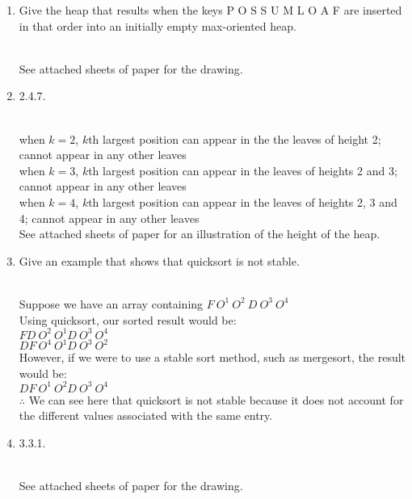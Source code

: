 \documentclass[11pt]{article}
\begin{document}
\begin{enumerate}
\begin{solution}
\end{solution}

\item Give the heap that results when the keys P O S S U M L O A F are inserted in that order into an initially empty max-oriented heap.\\
\begin{solution}\\
See attached sheets of paper for the drawing.
\end{solution}

\item 2.4.7.
\begin{solution}\\
when $k = 2$, $k$th largest position can appear in the the leaves of height 2; cannot appear in any other leaves\\
when $k = 3$, $k$th largest position can appear in the leaves of heights 2 and 3; cannot appear in any other leaves\\
when $k = 4$, $k$th largest position can appear in the leaves of heights 2, 3 and 4; cannot appear in any other leaves\\
See attached sheets of paper for an illustration of the height of the heap.
\end{solution}

\item Give an example that shows that quicksort is not stable.\\
\begin{solution}\\
Suppose we have an array containing $F\ O^{1}\ O^{2}\ D \ O^{3}\ O^{4}$\\
Using quicksort, our sorted result would be:\\
$F D\ O^{2}\ O^{1} D \ O^{3}\ O^{4}$\\
$D F\ O^{4}\ O^{1} D \ O^{3}\ O^{2}$\\
However, if we were to use a stable sort method, such as mergesort, the result would be:\\
$D F\ O^{1}\ O^{2} D \ O^{3}\ O^{4}$\\
$\therefore$ We can see here that quicksort is not stable because it does not account for the different values associated with the same entry. 
\end{solution}

\item 3.3.1.
\begin{solution}\\
See attached sheets of paper for the drawing.
\end{solution}


\end{enumerate}
\end{document}
